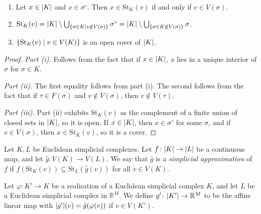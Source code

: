 \begin{lemma}
	\begin{enumerate}
		\item Let \( x \in \abs{K} \) and \( x \in \sigma^\circ \).
			Then \( x \in \mathrm{St}_K(v) \) if and only if \( v \in V(\sigma) \).
		\item \( \mathrm{St}_K(v) = \abs{K} \setminus \bigcup_{\qty{\sigma \in K \mid v \not\in V(\sigma)}} \sigma^\circ = \abs{K} \setminus \bigcup_{\qty{\sigma \in K \not\in V(\sigma)}} \sigma \).
		\item \( \qty{\mathrm{St}_K(v) \mid v \in V(K)} \) is an open cover of \( \abs{K} \).
	\end{enumerate}
\end{lemma}
\begin{proof}
	\emph{Part (i).}
	Follows from the fact that if \( x \in \abs{K} \), \( x \) lies in a unique interior of \( \sigma \) for \( \sigma \in K \).

	\emph{Part (ii).}
	The first equality follows from part (i).
	The second follows from the fact that if \( \tau \in F(\sigma) \) and \( v \not\in V(\sigma) \), then \( v \not\in V(\tau) \).

	\emph{Part (iii).}
	Part (ii) exhibits \( \mathrm{St}_K(v) \) as the complement of a finite union of closed sets in \( \abs{K} \), so it is open.
	If \( x \in \abs{K} \), then \( x \in \sigma^\circ \) for some \( \sigma \), and if \( v \in V(\sigma) \), then \( x \in \mathrm{St}_K(v) \), so it is a cover.
\end{proof}
\begin{definition}
	Let \( K, L \) be Euclidean simplicial complexes.
	Let \( f \colon \abs{K} \to \abs{L} \) be a continuous map, and let \( \hat g \colon V(K) \to V(L) \).
	We say that \( \hat g \) is a \emph{simplicial approximation} of \( f \) if \( f(\mathrm{St}_K(v)) \subseteq \mathrm{St}_L(\hat g(v)) \) for all \( v \in V(K) \).
\end{definition}
Let \( \varphi \colon K' \to K \) be a realisation of a Euclidean simplicial complex \( K \), and let \( L \) be a Euclidean simplicial complex in \( \mathbb R^M \).
We define \( g' \colon \abs{K'} \to \mathbb R^M \) to be the affine linear map with \( \abs{g'}(v) = \hat g(\varphi(v)) \) if \( v \in V(K') \).

